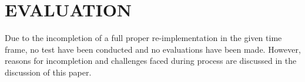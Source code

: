 \chapter{EVALUATION}

Due to the incompletion of a full proper re-implementation in the given time frame, no test have been conducted and no evaluations have been made. However, reasons for incompletion and challenges faced during process are discussed in the discussion of this paper.